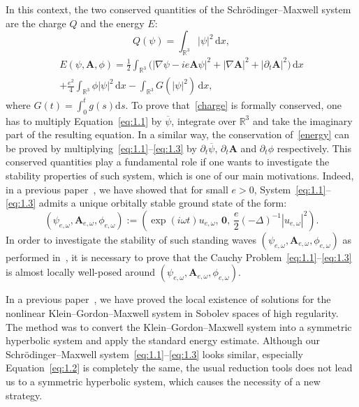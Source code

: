 \documentclass[AHL,Unicode,longabstracts]{cedram}
\newcommand{\BA}{\mathbf{A}}
\newcommand{\R}{\mathbb{R}}
\newcommand*{\dd}{\mathrm{d}}
\newcommand*{\ds}{\dd s}
\newcommand*{\dx}{\dd x}
\begin{document}
In this context, the two conserved quantities of the Schr\"odinger--Maxwell system are the charge $Q$ and the energy $E$:
\begin{equation}\label{charge}
Q(\psi)=\int_{\R^3} |\psi|^2 \,\dx,
\end{equation}
\vspace{-2\belowdisplayskip}
\begin{multline}\label{energy}
E(\psi,\BA,\phi)= \frac{1}{2}\int_{\R^3}
\big(|\nabla \psi -ie\BA \psi|^2+|\nabla \BA|^2 +|\partial_t \BA|^2\big) \,\dx\\
+\frac{e^2}{4} \int_{\R^3} \phi |\psi|^2 \,\dx -\int_{\R^3}G(|\psi|^2) \,\dx,
\end{multline}
where $G(t)=\int_0^t g(s)\ds$. To prove that~\eqref{charge} is formally conserved, one has to multiply Equation~\eqref{eq:1.1} by $\overline{\psi}$, integrate over $\R^3$ and take the imaginary part of the resulting equation. In a similar way, the conservation of~\eqref{energy} can be proved by multiplying~\eqref{eq:1.1}--\eqref{eq:1.3} by $\partial_t \overline{\psi}$, $\partial_t \BA$ and $\partial_t \phi$ respectively. This conserved quantities play a fundamental role if one wants to investigate the stability properties of such system, which is one of our main motivations. Indeed, in a previous paper~\cite{CW2}, we have showed that for small $e>0$, System~\eqref{eq:1.1}--\eqref{eq:1.3} admits a unique orbitally stable ground state of the form:
\begin{equation}\label{stand}
(\psi_{e,\omega}, \BA_{e,\omega}, \phi_{e,\omega}) := \left(\exp(i\omega t)u_{e,\omega}, \, \mathbf{0}, \,
\frac{e}{2} (-\Delta)^{-1} | u_{e,\omega}|^2 \right).
\end{equation}
In order to investigate the stability of such standing waves $(\psi_{e,\omega}, \BA_{e,\omega}, \phi_{e,\omega})$ as performed in~\cite{CW2}, it is necessary to prove that the Cauchy Problem~\eqref{eq:1.1}--\eqref{eq:1.3} is almost locally well-posed around $(\psi_{e,\omega}, \BA_{e,\omega}, \phi_{e,\omega})$.

In a previous paper~\cite{CW1}, we have proved the local existence of solutions for the nonlinear Klein--Gordon--Maxwell system in Sobolev spaces of high regularity. The method was to convert the Klein--Gordon--Maxwell system into a symmetric hyperbolic system and apply the standard energy estimate. Although our Schr\"odinger--Maxwell system~\eqref{eq:1.1}--\eqref{eq:1.3} looks similar, especially Equation~\eqref{eq:1.2} is completely the same, the usual reduction tools does not lead us to a symmetric hyperbolic system, which causes the necessity of a new strategy.
\end{document}
